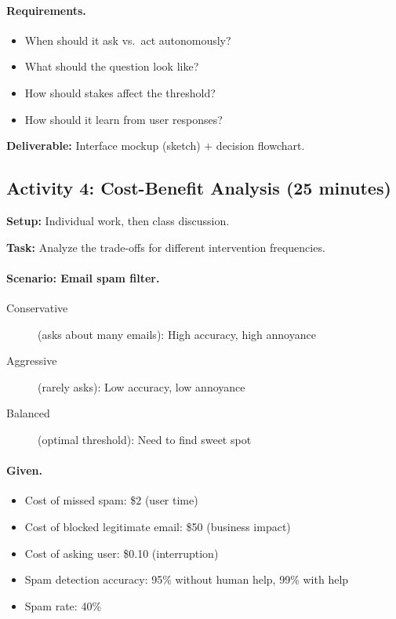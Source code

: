 \paragraph{Requirements.}
\begin{itemize}
    \item When should it ask vs.\ act autonomously?
    \item What should the question look like?
    \item How should stakes affect the threshold?
    \item How should it learn from user responses?
\end{itemize}

\textbf{Deliverable:} Interface mockup (sketch) + decision flowchart.

\subsection{Activity 4: Cost-Benefit Analysis (25 minutes)}

\textbf{Setup:} Individual work, then class discussion.

\textbf{Task:} Analyze the trade-offs for different intervention frequencies.

\paragraph{Scenario: Email spam filter.}
\begin{description}
    \item[Conservative] (asks about many emails): High accuracy, high annoyance
    \item[Aggressive] (rarely asks): Low accuracy, low annoyance
    \item[Balanced] (optimal threshold): Need to find sweet spot
\end{description}

\paragraph{Given.}
\begin{itemize}
    \item Cost of missed spam: \$2 (user time)
    \item Cost of blocked legitimate email: \$50 (business impact)
    \item Cost of asking user: \$0.10 (interruption)
    \item Spam detection accuracy: 95\% without human help, 99\% with help
    \item Spam rate: 40\%
\end{itemize}


